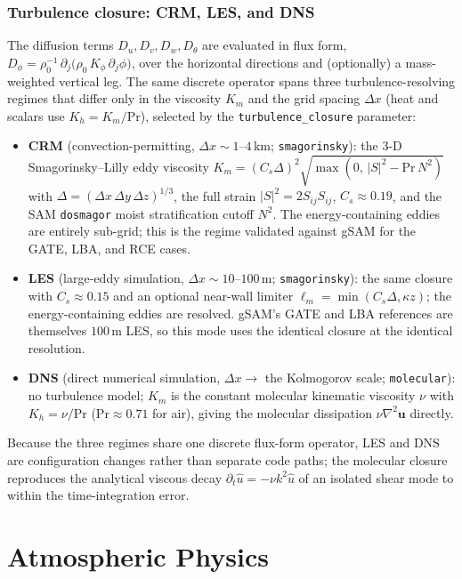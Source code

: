 \documentclass[11pt,a4paper]{article}
\begin{document}
\subsubsection{Turbulence closure: CRM, LES, and DNS}
The diffusion terms $D_u,D_v,D_w,D_\theta$ are evaluated in flux form, $D_\phi = \rho_0^{-1}\,\partial_j\!\bigl(\rho_0\,K_\phi\,\partial_j\phi\bigr)$, over the horizontal directions and (optionally) a mass-weighted vertical leg.  The same discrete operator spans three turbulence-resolving regimes that differ only in the viscosity $K_m$ and the grid spacing $\Delta x$ (heat and scalars use $K_h=K_m/\mathrm{Pr}$), selected by the \texttt{turbulence\_closure} parameter:
\begin{itemize}
  \item \textbf{CRM} (convection-permitting, $\Delta x\sim1$--$4$\,km; \texttt{smagorinsky}): the 3-D Smagorinsky--Lilly eddy viscosity $K_m=(C_s\Delta)^2\sqrt{\max(0,\,|S|^2-\mathrm{Pr}\,N^2)}$ with $\Delta=(\Delta x\,\Delta y\,\Delta z)^{1/3}$, the full strain $|S|^2=2S_{ij}S_{ij}$, $C_s\approx0.19$, and the SAM \texttt{dosmagor} moist stratification cutoff $N^2$.  The energy-containing eddies are entirely sub-grid; this is the regime validated against gSAM for the GATE, LBA, and RCE cases.
  \item \textbf{LES} (large-eddy simulation, $\Delta x\sim10$--$100$\,m; \texttt{smagorinsky}): the same closure with $C_s\approx0.15$ and an optional near-wall limiter $\ell_m=\min(C_s\Delta,\kappa z)$; the energy-containing eddies are resolved.  gSAM's GATE and LBA references are themselves $100$\,m LES, so this mode uses the identical closure at the identical resolution.
  \item \textbf{DNS} (direct numerical simulation, $\Delta x\to$ the Kolmogorov scale; \texttt{molecular}): no turbulence model; $K_m$ is the constant molecular kinematic viscosity $\nu$ with $K_h=\nu/\mathrm{Pr}$ ($\mathrm{Pr}\approx0.71$ for air), giving the molecular dissipation $\nu\nabla^2\bm u$ directly.
\end{itemize}
Because the three regimes share one discrete flux-form operator, LES and DNS are configuration changes rather than separate code paths; the molecular closure reproduces the analytical viscous decay $\partial_t\hat u=-\nu k^2\hat u$ of an isolated shear mode to within the time-integration error.

\section{Atmospheric Physics}
\end{document}
